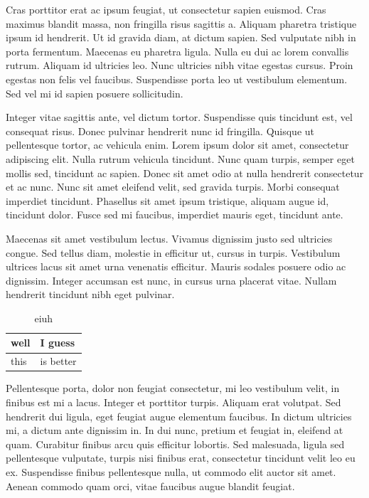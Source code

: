 \documentclass[a4paper]{article}
\begin{document}
Cras porttitor erat ac ipsum feugiat, ut consectetur sapien euismod. Cras maximus blandit massa, non fringilla risus sagittis a. Aliquam pharetra tristique ipsum id hendrerit. Ut id gravida diam, at dictum sapien. Sed vulputate nibh in porta fermentum. Maecenas eu pharetra ligula. Nulla eu dui ac lorem convallis rutrum. Aliquam id ultricies leo. Nunc ultricies nibh vitae egestas cursus. Proin egestas non felis vel faucibus. Suspendisse porta leo ut vestibulum elementum. Sed vel mi id sapien posuere sollicitudin.

Integer vitae sagittis ante, vel dictum tortor. Suspendisse quis tincidunt est, vel consequat risus. Donec pulvinar hendrerit nunc id fringilla. Quisque ut pellentesque tortor, ac vehicula enim. Lorem ipsum dolor sit amet, consectetur adipiscing elit. Nulla rutrum vehicula tincidunt. Nunc quam turpis, semper eget mollis sed, tincidunt ac sapien. Donec sit amet odio at nulla hendrerit consectetur et ac nunc. Nunc sit amet eleifend velit, sed gravida turpis. Morbi consequat imperdiet tincidunt. Phasellus sit amet ipsum tristique, aliquam augue id, tincidunt dolor. Fusce sed mi faucibus, imperdiet mauris eget, tincidunt ante.

Maecenas sit amet vestibulum lectus. Vivamus dignissim justo sed ultricies congue. Sed tellus diam, molestie in efficitur ut, cursus in turpis. Vestibulum ultrices lacus sit amet urna venenatis efficitur. Mauris sodales posuere odio ac dignissim. Integer accumsan est nunc, in cursus urna placerat vitae. Nullam hendrerit tincidunt nibh eget pulvinar.

\begin{table}[htbp]
	\centering
	\caption{eiuh}
	\begin{tabular}{ll}
		\toprule
		well & I guess   \\
		\midrule
		this & is better \\
		\bottomrule
	\end{tabular}
\end{table}

Pellentesque porta, dolor non feugiat consectetur, mi leo vestibulum velit, in finibus est mi a lacus. Integer et porttitor turpis. Aliquam erat volutpat. Sed hendrerit dui ligula, eget feugiat augue elementum faucibus. In dictum ultricies mi, a dictum ante dignissim in. In dui nunc, pretium et feugiat in, eleifend at quam. Curabitur finibus arcu quis efficitur lobortis. Sed malesuada, ligula sed pellentesque vulputate, turpis nisi finibus erat, consectetur tincidunt velit leo eu ex. Suspendisse finibus pellentesque nulla, ut commodo elit auctor sit amet. Aenean commodo quam orci, vitae faucibus augue blandit feugiat.
\end{document}
